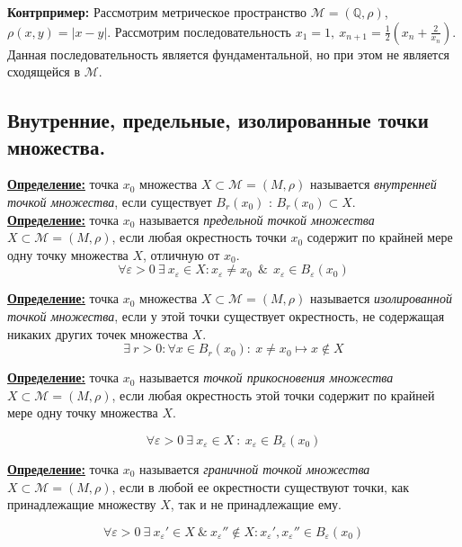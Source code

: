 \documentclass[a4paper,12pt]{article} %
\begin{document}
\textbf{Контрпример:} Рассмотрим метрическое пространство $\mathscr{M} = (\mathbb{Q}, \rho)$, $\rho(x, y) = |x - y|$. Рассмотрим последовательность $x_1 = 1, ~ x_{n + 1} = \frac{1}{2}(x_n + \frac{2}{x_n})$. Данная последовательность является фундаментальной, но при этом не является сходящейся в $\mathscr{M}$.\\

\subsection{Внутренние, предельные, изолированные точки множества.}

\underline{\textbf{Определение:}} точка $x_0$ множества $X \subset \mathscr{M} = (M, \rho)$ называется \textit{внутренней точкой множества}, если существует $B_{r}(x_0)$ : $B_{r}(x_0) \subset X$.\\

\underline{\textbf{Определение:}} точка $x_0$ называется \textit{предельной точкой множества} $X \subset \mathscr{M} = (M, \rho)$, если любая окрестность точки $x_0$ содержит по крайней мере одну точку множества $X$, отличную от $x_0$.
\[ \forall \varepsilon > 0 ~ \exists ~ x_{\varepsilon} \in X : x_{\varepsilon} \neq x_0 ~~ \& ~~ x_{\varepsilon} \in B_{\varepsilon}(x_0) \]

\underline{\textbf{Определение:}} точка $x_0$ множества $X \subset \mathscr{M} = (M, \rho)$ называется \textit{изолированной точкой множества}, если у этой точки существует окрестность, не содержащая никаких других точек множества $X$.
\[ \exists ~ r > 0 : \forall x \in B_r(x_0) : ~ x \neq x_0 \mapsto x \notin X \]

\underline{\textbf{Определение:}} точка $x_0$ называется \textit{точкой прикосновения множества} $X \subset \mathscr{M} = (M, \rho)$, если любая окрестность этой точки содержит по крайней мере одну точку множества $X$.

\[ \forall \varepsilon > 0 ~ \exists ~ x_{\varepsilon} \in X ~ : ~ x_{\varepsilon} \in B_{\varepsilon}(x_0) \]

\underline{\textbf{Определение:}} точка $x_0$ называется \textit{граничной точкой множества}  $X \subset \mathscr{M} = (M, \rho)$, если в любой ее окрестности существуют точки, как принадлежащие множеству $X$, так и не принадлежащие ему.

\[ \forall \varepsilon > 0 ~ \exists ~ x_{\varepsilon}' \in X ~ \& ~ x_{\varepsilon}'' \notin X : x_{\varepsilon}', x_{\varepsilon}'' \in B_{\varepsilon}(x_0)\]
\end{document}

